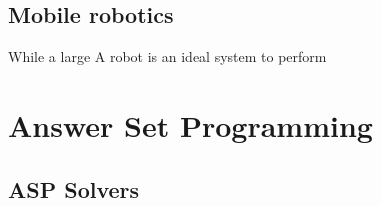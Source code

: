 \subsection{Mobile robotics}
While a large A robot is an ideal system to perform 






\section{Answer Set Programming} %

\subsection{ASP Solvers}









% 

